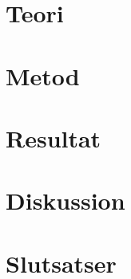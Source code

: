 
\section{Teori}
\label{sec:theory-tuhkala}


\section{Metod}
\label{sec:method-tuhkala}


\section{Resultat}
\label{sec:results-tuhkala}


\section{Diskussion}
\label{sec:discussion-tuhkala}


\section{Slutsatser}
\label{sec:conclusions-tuhkala}


